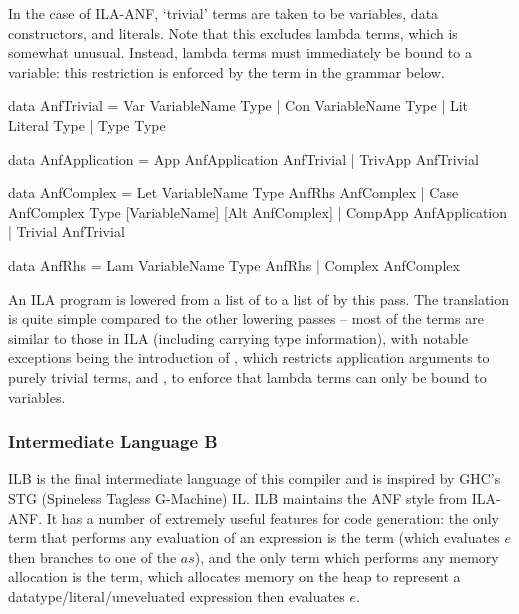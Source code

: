 \documentclass[dissertation.tex]{subfiles}
\begin{document}
{{{            In the case of ILA-ANF, `trivial' terms are taken to be variables, data constructors, and literals. Note
            that this excludes lambda terms, which is somewhat unusual. Instead, lambda terms must immediately be bound
            to a variable: this restriction is enforced by the  term in the grammar below.


            \begin{haskellfigure}
            data AnfTrivial = Var VariableName Type
                            | Con VariableName Type
                            | Lit Literal Type
                            | Type Type

            data AnfApplication = App AnfApplication AnfTrivial
                                | TrivApp AnfTrivial

            data AnfComplex = Let VariableName Type AnfRhs AnfComplex
                            | Case AnfComplex Type [VariableName] [Alt AnfComplex]
                            | CompApp AnfApplication
                            | Trivial AnfTrivial

            data AnfRhs = Lam VariableName Type AnfRhs
                        | Complex AnfComplex
            \end{haskellfigure}

            An ILA program is lowered from a list of  to a list of  by
            this pass. The translation is quite simple compared to the other lowering passes -- most of the terms are
            similar to those in ILA (including carrying type information), with notable exceptions being the
            introduction of , which restricts application arguments to purely trivial terms, and
            , to enforce that lambda terms can only be bound to variables.

        }
        \subsubsection{Intermediate Language B}
        {

            ILB is the final intermediate language of this compiler and is inspired by GHC's STG (Spineless Tagless
            G-Machine) IL. ILB maintains the ANF style from ILA-ANF. It has a number of extremely useful features for
            code generation: the only term that performs any evaluation of an expression is the  term (which evaluates \(e\) then branches to one of the \(as\)), and the only term which
            performs any memory allocation is the \haskell{ExpLit #\(v\ r\ e\)#} term, which allocates memory on the
            heap to represent a datatype/literal/uneveluated expression then evaluates \(e\).

}}}
\end{document}
